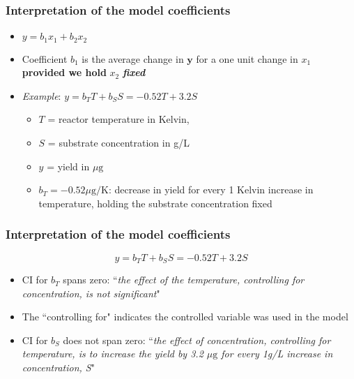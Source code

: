 \begin{frame}\frametitle{Interpretation of the model coefficients}
	\begin{itemize}
		\item	$y = b_1x_1 + b_2x_2$
	\end{itemize}
	\begin{itemize}
		\item	Coefficient $b_1$ is the average change in $\mathbf{y}$ for a one unit change in ${x}_1$ \textbf{provided we hold} ${x}_2$ \textbf{\emph{fixed}}
	\end{itemize}
	
	\vspace{24pt}
	\begin{itemize}
		\item	\emph{Example}: $y = b_T T + b_S S = -0.52 T + 3.2 S$
		
		\vspace{12pt}
		\begin{itemize}
			\item	$T$ = reactor temperature in Kelvin,
			\item	$S$ = substrate concentration in g/L
			\item	$y$ = yield in $\mu\text{g}$
			
			\vspace{12pt}
			\item	$b_T = -0.52 \mu\text{g}/\text{K}$: decrease in yield for every 1 Kelvin increase in temperature, holding the substrate concentration fixed
		\end{itemize}
	\end{itemize}
\end{frame}

\begin{frame}\frametitle{Interpretation of the model coefficients}

	$$y = b_T T + b_S S = -0.52 T + 3.2 S$$
	\begin{itemize}
		\item	CI for $b_T$ spans zero: ``\emph{the effect of the temperature, controlling for concentration, is not significant}"
		\item	The ``controlling for" indicates the controlled variable was used in the model
		\item	CI for $b_S$ does not span zero: ``\emph{the effect of concentration, controlling for temperature, is to increase the yield by 3.2 $\mu\text{g}$ for every 1g/L increase in concentration, S}"
	\end{itemize}
\end{frame}

